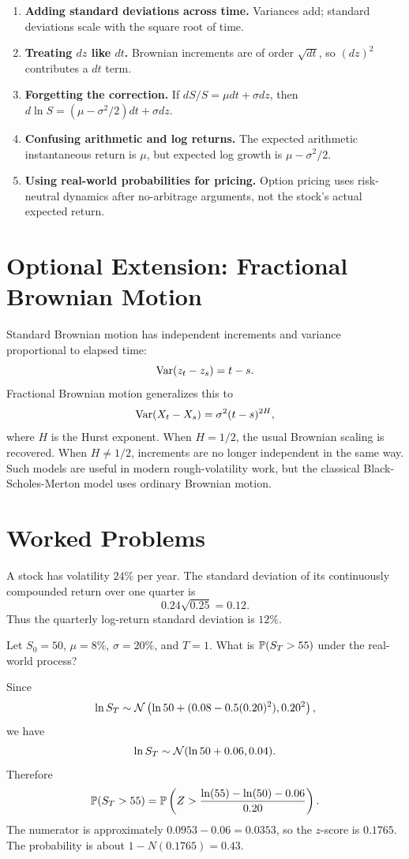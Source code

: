 \begin{enumerate}
    \item \textbf{Adding standard deviations across time.} Variances add;
    standard deviations scale with the square root of time.
    \item \textbf{Treating $dz$ like $dt$.} Brownian increments are of order
    $\sqrt{dt}$, so $(dz)^2$ contributes a $dt$ term.
    \item \textbf{Forgetting the \Ito correction.} If $dS/S=\mu dt+\sigma dz$,
    then $d\ln S=(\mu-\sigma^2/2)dt+\sigma dz$.
    \item \textbf{Confusing arithmetic and log returns.} The expected
    arithmetic instantaneous return is $\mu$, but expected log growth is
    $\mu-\sigma^2/2$.
    \item \textbf{Using real-world probabilities for pricing.} Option pricing
    uses risk-neutral dynamics after no-arbitrage arguments, not the stock's
    actual expected return.
\end{enumerate}

\section{Optional Extension: Fractional Brownian Motion}

Standard Brownian motion has independent increments and variance proportional
to elapsed time:
\[
    \operatorname{Var}(z_t-z_s)=t-s.
\]
Fractional Brownian motion generalizes this to
\[
    \operatorname{Var}(X_t-X_s)=\sigma^2(t-s)^{2H},
\]
where $H$ is the Hurst exponent. When $H=1/2$, the usual Brownian scaling is
recovered. When $H\neq 1/2$, increments are no longer independent in the same
way. Such models are useful in modern rough-volatility work, but the classical
Black-Scholes-Merton model uses ordinary Brownian motion.

\section{Worked Problems}

\begin{exmp}
A stock has volatility $24\%$ per year. The standard deviation of its
continuously compounded return over one quarter is
\[
    0.24\sqrt{0.25}=0.12.
\]
Thus the quarterly log-return standard deviation is $12\%$.
\end{exmp}

\begin{exmp}
Let $S_0=50$, $\mu=8\%$, $\sigma=20\%$, and $T=1$. What is
$\mathbb{P}(S_T>55)$ under the real-world process?

Since
\[
    \ln S_T
    \sim
    \mathcal{N}\left(\ln 50+(0.08-0.5(0.20)^2),0.20^2\right),
\]
we have
\[
    \ln S_T
    \sim
    \mathcal{N}(\ln 50+0.06,0.04).
\]
Therefore
\[
    \mathbb{P}(S_T>55)
    =
    \mathbb{P}\left(
        Z>
        \frac{\ln(55)-\ln(50)-0.06}{0.20}
    \right).
\]
The numerator is approximately $0.0953-0.06=0.0353$, so the $z$-score is
$0.1765$. The probability is about $1-N(0.1765)=0.43$.
\end{exmp}

